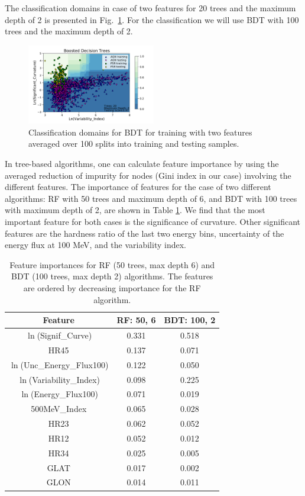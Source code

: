 The classification domains in case of two features for 20 trees and the maximum depth of 2 is presented in Fig.~\ref{fig:BDT_domains}. 
For the classification we will use BDT with 100 trees and the maximum depth of 2.


\begin{figure}[h]
\centering
\includegraphics[width=0.5\textwidth]{plots/classification_domains/bdt_20_2.pdf}
\caption{Classification domains for BDT for training with two features 
averaged over 100 splits into training and testing samples.
}
\label{fig:BDT_domains}
\end{figure}



In tree-based algorithms, one can calculate feature importance by using the averaged reduction of impurity for nodes (Gini index in our case) involving the different features. 
The importance of features for the case of two different algorithms: RF with 50 trees and maximum depth of 6, and BDT with 100 trees with maximum depth of 2,  are shown in Table \ref{tab:feat_imp}.
We find that the most important feature for both cases is the significance of curvature.
Other significant features are the hardness ratio of the last two energy bins, uncertainty of the energy flux at 100 MeV, and the variability index.


\begin{table}[!h]
\tiny
\centering
\renewcommand{\tabcolsep}{1mm}
\renewcommand{\arraystretch}{1}

\begin{tabular}{c c c}
\hline
\hline
Feature & RF: 50, 6 & BDT: 100, 2\\
\hline
{ $\ln$(Signif\_Curve)}&  0.331  & 0.518   \\
{ HR45}&0.137&0.071\\
{ $\ln$(Unc\_Energy\_Flux100)} &0.122& 0.050   \\
$\ln$(Variability\_Index)& 0.098&0.225  \\
$\ln$(Energy\_Flux100) & 0.071&0.019   \\
500MeV\_Index&0.065& 0.028  \\
HR23 & 0.062&0.052  \\
HR12& 0.052&0.012  \\
HR34&0.025&0.005\\
GLAT &0.017& 0.002     \\
GLON & 0.014&0.011  \\
\hline
\end{tabular}
\vspace{2mm}
\caption{Feature importances for RF (50 trees, max depth 6) and BDT (100 trees, max depth 2) algorithms.
The features are ordered by decreasing importance for the RF algorithm.
}
\label{tab:feat_imp}
\end{table}

